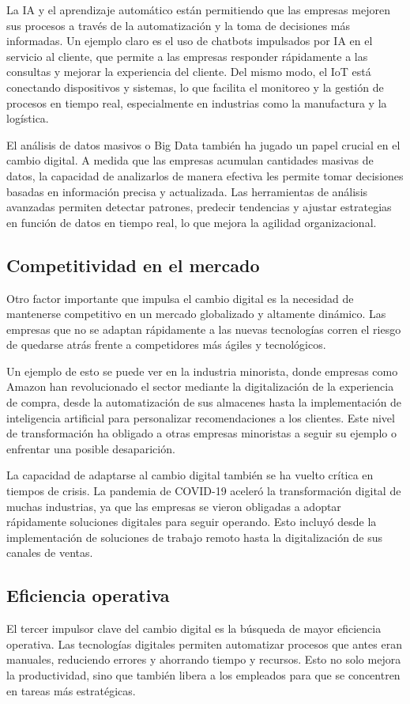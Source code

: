 \documentclass[letterpaper,12pt]{article}
\begin{document}
La IA y el aprendizaje automático están permitiendo que las empresas mejoren sus procesos a través de la automatización y la toma de decisiones más informadas. Un ejemplo claro es el uso de chatbots impulsados por IA en el servicio al cliente, que permite a las empresas responder rápidamente a las consultas y mejorar la experiencia del cliente. Del mismo modo, el IoT está conectando dispositivos y sistemas, lo que facilita el monitoreo y la gestión de procesos en tiempo real, especialmente en industrias como la manufactura y la logística.

El análisis de datos masivos o Big Data también ha jugado un papel crucial en el cambio digital. A medida que las empresas acumulan cantidades masivas de datos, la capacidad de analizarlos de manera efectiva les permite tomar decisiones basadas en información precisa y actualizada. Las herramientas de análisis avanzadas permiten detectar patrones, predecir tendencias y ajustar estrategias en función de datos en tiempo real, lo que mejora la agilidad organizacional.

\subsection*{Competitividad en el mercado}
Otro factor importante que impulsa el cambio digital es la necesidad de mantenerse competitivo en un mercado globalizado y altamente dinámico. Las empresas que no se adaptan rápidamente a las nuevas tecnologías corren el riesgo de quedarse atrás frente a competidores más ágiles y tecnológicos.

Un ejemplo de esto se puede ver en la industria minorista, donde empresas como Amazon han revolucionado el sector mediante la digitalización de la experiencia de compra, desde la automatización de sus almacenes hasta la implementación de inteligencia artificial para personalizar recomendaciones a los clientes. Este nivel de transformación ha obligado a otras empresas minoristas a seguir su ejemplo o enfrentar una posible desaparición.

La capacidad de adaptarse al cambio digital también se ha vuelto crítica en tiempos de crisis. La pandemia de COVID-19 aceleró la transformación digital de muchas industrias, ya que las empresas se vieron obligadas a adoptar rápidamente soluciones digitales para seguir operando. Esto incluyó desde la implementación de soluciones de trabajo remoto hasta la digitalización de sus canales de ventas.

\subsection*{Eficiencia operativa}
El tercer impulsor clave del cambio digital es la búsqueda de mayor eficiencia operativa. Las tecnologías digitales permiten automatizar procesos que antes eran manuales, reduciendo errores y ahorrando tiempo y recursos. Esto no solo mejora la productividad, sino que también libera a los empleados para que se concentren en tareas más estratégicas.
\end{document}
